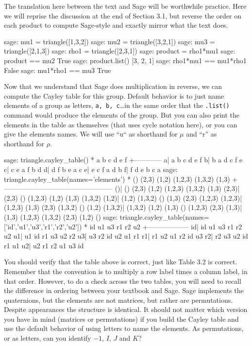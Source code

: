 %
The translation here between the text and Sage will be worthwhile practice.  Here we will reprise the discussion at the end of Section 3.1, but reverse the order on each product to compute Sage-style and exactly mirror what the text does.
%
\begin{sageexample}
sage: mu1 = triangle([1,3,2])
sage: mu2 = triangle([3,2,1])
sage: mu3 = triangle([2,1,3])
sage: rho1 = triangle([2,3,1])
sage: product = rho1*mu1
sage: product == mu2
True
sage: product.list()
[3, 2, 1]
sage: rho1*mu1 == mu1*rho1
False
sage: mu1*rho1 == mu3
True
\end{sageexample}
%
Now that we understand that Sage does multiplication in reverse, we can compute the Cayley table for this group.  Default behavior is to just name elements of a group as letters, \verb?a, b, c?\dots in the same order that the \verb?.list()? command would produce the elements of the group.  But you can also print the elements in the table as themselves (that uses cycle notation here), or you can give the elements names.  We will use ``u`` as shorthand for $\mu$ and ``r'' as shorthand for $\rho$.
%
\begin{sageexample}
sage: triangle.cayley_table()
*  a b c d e f
 +------------
a| a b c d e f
b| b a d c f e
c| c e a f b d
d| d f b e a c
e| e c f a d b
f| f d e b c a
sage: triangle.cayley_table(names='elements')
      *       ()   (2,3)   (1,2) (1,2,3) (1,3,2)   (1,3)
       +------------------------------------------------
     ()|      ()   (2,3)   (1,2) (1,2,3) (1,3,2)   (1,3)
  (2,3)|   (2,3)      () (1,2,3)   (1,2)   (1,3) (1,3,2)
  (1,2)|   (1,2) (1,3,2)      ()   (1,3)   (2,3) (1,2,3)
(1,2,3)| (1,2,3)   (1,3)   (2,3) (1,3,2)      ()   (1,2)
(1,3,2)| (1,3,2)   (1,2)   (1,3)      () (1,2,3)   (2,3)
  (1,3)|   (1,3) (1,2,3) (1,3,2)   (2,3)   (1,2)      ()
sage: triangle.cayley_table(names=['id','u1','u3','r1','r2','u2'])
 *  id u1 u3 r1 r2 u2
  +------------------
id| id u1 u3 r1 r2 u2
u1| u1 id r1 u3 u2 r2
u3| u3 r2 id u2 u1 r1
r1| r1 u2 u1 r2 id u3
r2| r2 u3 u2 id r1 u1
u2| u2 r1 r2 u1 u3 id
\end{sageexample}
%
You should verify that the table above is correct, just like Table 3.2 is correct.  Remember that the convention is to multiply a row label times a column label, in that order.  However, to do a check across the two tables, you will need to recall the difference in ordering between your textbook and Sage.
%
%
Sage implements the quaternions, but the elements are not matrices, but rather are permutations.  Despite appearances the structure is identical.  It should not matter which version you have in mind (matrices or permutations) if you build the Cayley table and use the default behavior of using letters to name the elements.  As permutations, or as letters, can you identify $-1$, $I$, $J$ and $K$?
